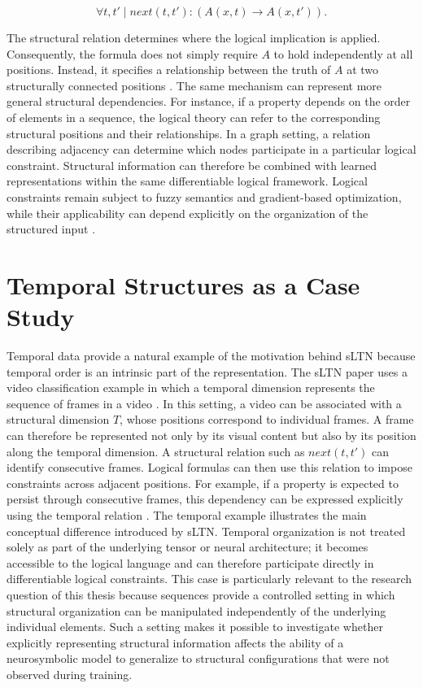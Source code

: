$$
\forall t,t' \mid \mathit{next}(t,t') :
\left(A(x,t) \rightarrow A(x,t')\right).
$$

The structural relation determines where the logical implication is applied. Consequently, the formula does not simply require $A$ to hold independently at all positions. Instead, it specifies a relationship between the truth of $A$ at two structurally connected positions \cite{rinaldi2026sltn}.
The same mechanism can represent more general structural dependencies. For instance, if a property depends on the order of elements in a sequence, the logical theory can refer to the corresponding structural positions and their relationships. In a graph setting, a relation describing adjacency can determine which nodes participate in a particular logical constraint.
Structural information can therefore be combined with learned representations within the same differentiable logical framework. Logical constraints remain subject to fuzzy semantics and gradient-based optimization, while their applicability can depend explicitly on the organization of the structured input \cite{rinaldi2026sltn}.

\section{Temporal Structures as a Case Study}
\noindent
Temporal data provide a natural example of the motivation behind sLTN because temporal order is an intrinsic part of the representation. The sLTN paper uses a video classification example in which a temporal dimension represents the sequence of frames in a video \cite{rinaldi2026sltn}.
In this setting, a video can be associated with a structural dimension $T$, whose positions correspond to individual frames. A frame can therefore be represented not only by its visual content but also by its position along the temporal dimension.
A structural relation such as $\mathit{next}(t,t')$ can identify consecutive frames. Logical formulas can then use this relation to impose constraints across adjacent positions. For example, if a property is expected to persist through consecutive frames, this dependency can be expressed explicitly using the temporal relation \cite{rinaldi2026sltn}.
The temporal example illustrates the main conceptual difference introduced by sLTN. Temporal organization is not treated solely as part of the underlying tensor or neural architecture; it becomes accessible to the logical language and can therefore participate directly in differentiable logical constraints.
This case is particularly relevant to the research question of this thesis because sequences provide a controlled setting in which structural organization can be manipulated independently of the underlying individual elements. Such a setting makes it possible to investigate whether explicitly representing structural information affects the ability of a neurosymbolic model to generalize to structural configurations that were not observed during training.

